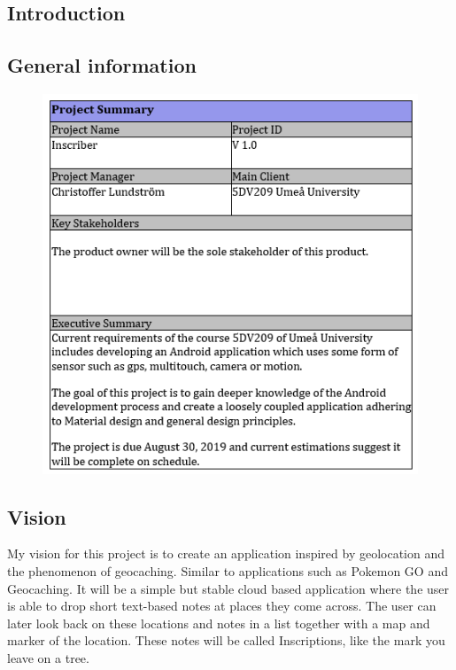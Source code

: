 \documentclass[]{article}
\begin{document}
\begin{flushleft}
\section{Introduction}


\subsection{General information}

\begin{figure}[H]
\includegraphics[scale=0.9]{summary.png}
\end{figure}

\newpage
\subsection{Vision}

My vision for this project is to create an application inspired by geolocation and the phenomenon of geocaching. Similar to applications such as Pokemon GO and Geocaching\texttrademark. It will be a simple but stable cloud based application where the user is able to drop short text-based notes at places they come across. The user can later look back on these locations and notes in a list together with a map and marker of the location. These notes will be called Inscriptions, like the mark you leave on a tree.\medskip


\end{flushleft}
\end{document}
